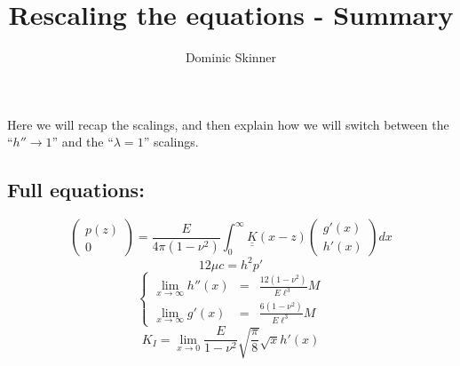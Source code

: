 \documentclass{article}
\begin{document}
\title{Rescaling the equations - Summary}
\author{Dominic Skinner}
\maketitle
Here we will recap the scalings, and then explain how we will switch between
the ``$h''\to1$'' and the ``$\lambda = 1$'' scalings.
\subsection*{Full equations:}
%
\begin{equation}
 \left( \begin{array}{c} p(z) \\ 0 \end{array} \right) =
\frac{E}{4\pi (1-\nu^2)} \int_0^{\infty} 
\underline{\underline{K}}(x-z) 
\left( \begin{array}{c} g'(x) \\ h'(x) \end{array} \right) dx
\end{equation}
%
\begin{equation}
12\mu c = h^2 p'
\end{equation}
%
\begin{equation}
\left\{ \begin{array}{ccc}
\displaystyle \lim_{x\to\infty} h''(x) & = & \frac{12(1-\nu^2)}{E\ell^3} M \\
\displaystyle \lim_{x\to\infty} g'(x) & = & \frac{6(1-\nu^2)}{E\ell^3} M 
\end{array} \right.
\end{equation}
%
\begin{equation}
K_I = \lim_{x\to 0} \frac{E}{1-\nu^2} \sqrt{\frac{\pi}{8}} \sqrt{x} h'(x)
\end{equation}
%
\end{document}
